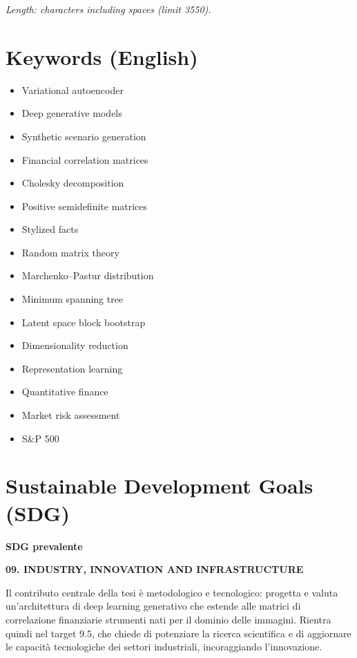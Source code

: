 \documentclass[11pt,a4paper]{article}
\newcommand{\camposdg}[2]{%
  \par\noindent\parbox[t]{0.22\textwidth}{\raggedright\bfseries #1}%
  \parbox[t]{0.76\textwidth}{\raggedright #2}\par\medskip}
\begin{document}
{\small\itshape Length: \unskip{} characters including
spaces (limit 3550).\par}
\vspace{0.4em}



\section{Keywords (English)}

\begin{itemize}[leftmargin=1.3em,itemsep=0.15em,topsep=0.3em]
  \item Variational autoencoder
  \item Deep generative models
  \item Synthetic scenario generation
  \item Financial correlation matrices
  \item Cholesky decomposition
  \item Positive semidefinite matrices
  \item Stylized facts
  \item Random matrix theory
  \item Marchenko--Pastur distribution
  \item Minimum spanning tree
  \item Latent space block bootstrap
  \item Dimensionality reduction
  \item Representation learning
  \item Quantitative finance
  \item Market risk assessment
  \item S\&P 500
\end{itemize}

\section{Sustainable Development Goals (SDG)}

\camposdg{SDG prevalente}{\textbf{09. INDUSTRY, INNOVATION AND INFRASTRUCTURE}}

\noindent\small Il contributo centrale della tesi è metodologico e
tecnologico: progetta e valuta un'architettura di deep learning generativo che
estende alle matrici di correlazione finanziarie strumenti nati per il dominio
delle immagini. Rientra quindi nel target 9.5, che chiede di potenziare la
ricerca scientifica e di aggiornare le capacità tecnologiche dei settori
industriali, incoraggiando l'innovazione.\normalsize
\end{document}
